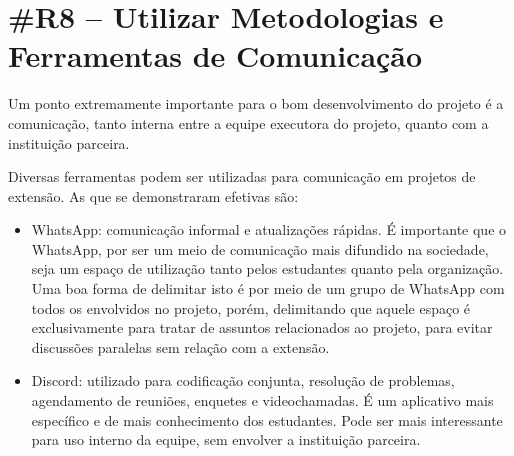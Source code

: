 \section*{\#R8 – Utilizar Metodologias e Ferramentas de Comunicação}

Um ponto extremamente importante para o bom desenvolvimento do projeto é a comunicação, tanto interna entre a equipe executora do projeto, quanto com a instituição parceira. 

Diversas ferramentas podem ser utilizadas para comunicação em projetos de extensão. As que se demonstraram efetivas são:
\begin{itemize}
    \item WhatsApp: comunicação informal e atualizações rápidas. É importante que o WhatsApp, por ser um meio de comunicação mais difundido na sociedade, seja um espaço de utilização tanto pelos estudantes quanto pela organização. Uma boa forma de delimitar isto é por meio de um grupo de WhatsApp com todos os envolvidos no projeto, porém, delimitando que aquele espaço é exclusivamente para tratar de assuntos relacionados ao projeto, para evitar discussões paralelas sem relação com a extensão.
    \item Discord: utilizado para codificação conjunta, resolução de problemas, agendamento de reuniões, enquetes e videochamadas. É um aplicativo mais específico e de mais conhecimento dos estudantes. Pode ser mais interessante para uso interno da equipe, sem envolver a instituição parceira.
\end{itemize}